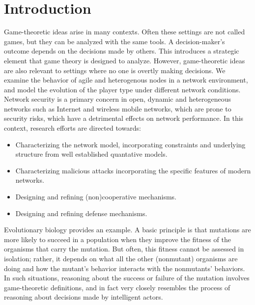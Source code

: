 \documentclass[10pt]{article}
\theoremstyle{definition}
\begin{document}
\section{Introduction}

Game-theoretic ideas arise in many contexts. Often these settings are not called games, but they 
can be analyzed with the same tools. A decision-maker’s outcome depends on the decisions made by others. This 
introduces a strategic element that game theory is designed to analyze. However, game-theoretic 
ideas are also relevant to settings where no one is overtly making decisions. We
examine the behavior of agile and heterogenous nodes in a network environment, and model the
evolution of the player type under different network conditions. 
Network security is a primary concern in open, 
dynamic and heterogeneous networks such as Internet and wireless mobile networks, 
which are prone to security risks, which have a detrimental effects on network performance. In this context,
research efforts are directed towards:
\begin{itemize}
    \item Characterizing the network model, incorporating constraints and
    underlying structure from well established quantative models.
	\item Characterizing malicious attacks incorporating the specific features of modern networks.
	\item Designing and refining (non)cooperative mechanisms.
	\item Designing and refining defense mechanisms.
\end{itemize}
Evolutionary biology provides an example. A basic principle is that mutations are more likely 
to succeed in a population when they improve the fitness of the organisms that carry the mutation. 
But often, this fitness cannot be assessed in isolation; rather, it depends on what all the other 
(nonmutant) organisms are doing and how the mutant’s behavior interacts with the nonmutants’ 
behaviors. In such situations, reasoning about the success or failure of the mutation involves 
game-theoretic definitions, and in fact very closely resembles the process of reasoning about 
decisions made by intelligent actors. 
\end{document}

